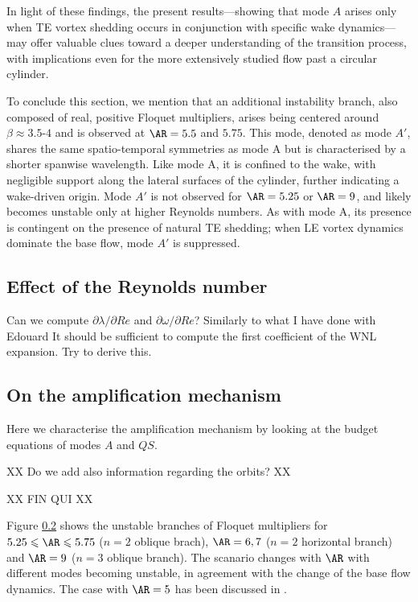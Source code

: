 %
In light of these findings, the present results---showing that mode $A$ arises only when TE vortex shedding occurs in conjunction with specific wake dynamics---may offer valuable clues toward a deeper understanding of the transition process, with implications even for the more extensively studied flow past a circular cylinder.

To conclude this section, we mention that an additional  instability branch, also composed of real, positive Floquet multipliers, arises being centered around $\beta \approx 3.5$-$4$ and is observed at $\AR = 5.5$ and $5.75$. This mode, denoted as mode $A'$, shares the same spatio-temporal symmetries as mode A but is characterised by a shorter spanwise wavelength. Like mode A, it is confined to the wake, with negligible support along the lateral surfaces of the cylinder, further indicating a wake-driven origin. Mode $A'$ is not observed for $\AR = 5.25$ or $\AR = 9$, and likely becomes unstable only at higher Reynolds numbers. As with mode A, its presence is contingent on the presence of natural TE shedding; when LE vortex dynamics dominate the base flow, mode $A'$ is suppressed.

\subsection{Effect of the Reynolds number}

Can we compute $\partial \lambda/\partial Re$ and $\partial \omega/\partial Re$? Similarly to what I have done with Edouard
It should be sufficient to compute the first coefficient of the WNL expansion. Try to derive this.


\subsection{On the amplification mechanism}

Here we characterise the amplification mechanism by looking at the budget equations of modes $A$ and $QS$.

XX Do we add also information regarding the orbits? XX

XX FIN QUI XX

Figure \ref{} shows the unstable branches of Floquet multipliers for $5.25 \le \AR \le 5.75$ ($n=2$ oblique brach), $\AR=6,7$ ($n=2$ horizontal branch) and $\AR=9$ ($n=3$ oblique branch). The scanario changes with $\AR$ with different modes becoming unstable, in agreement with the change of the base flow dynamics. The case with $\AR=5$ has been discussed in \cite{chiarini-quadrio-auteri-2022d}.

